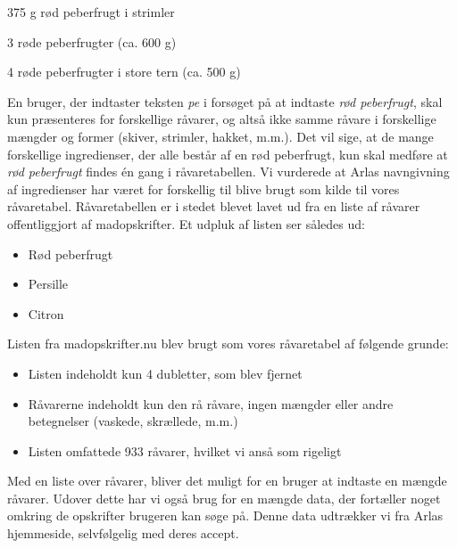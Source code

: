 375 g rød peberfrugt i strimler

3 røde peberfrugter (ca. 600 g)

4 røde peberfrugter i store tern (ca. 500 g)

En bruger, der indtaster teksten \textit{pe} i forsøget på at indtaste \textit{rød peberfrugt}, skal kun præsenteres for forskellige råvarer, og altså ikke samme råvare i forskellige mængder og former (skiver, strimler, hakket, m.m.). Det vil sige, at de mange forskellige ingredienser, der alle består af en rød peberfrugt, kun skal medføre at \textit{rød peberfrugt} findes én gang i råvaretabellen. Vi vurderede at Arlas navngivning af ingredienser har været for forskellig til blive brugt som kilde til vores råvaretabel. Råvaretabellen er i stedet blevet lavet ud fra en liste af råvarer offentliggjort af madopskrifter. Et udpluk af listen ser således ud:

\begin{itemize}
\item Rød peberfrugt
\item Persille
\item Citron
\end{itemize}

Listen fra madopskrifter.nu blev brugt som vores råvaretabel af følgende grunde:

\begin{itemize}
\item Listen indeholdt kun 4 dubletter, som blev fjernet
\item Råvarerne indeholdt kun den rå råvare, ingen mængder eller andre betegnelser (vaskede, skrællede, m.m.)
\item Listen omfattede 933 råvarer, hvilket vi anså som rigeligt
\end{itemize}

Med en liste over råvarer, bliver det muligt for en bruger at indtaste en mængde råvarer. Udover dette har vi også brug for en mængde data, der fortæller noget omkring de opskrifter brugeren kan søge på. Denne data udtrækker vi fra Arlas hjemmeside, selvfølgelig med deres accept.

